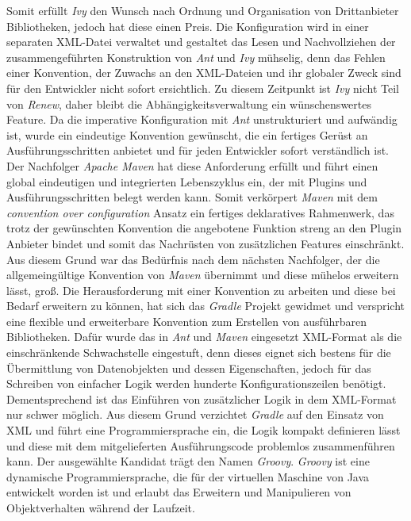 		Somit erfüllt \textit{Ivy} den Wunsch nach Ordnung und Organisation von Drittanbieter Bibliotheken, jedoch hat diese einen Preis. Die Konfiguration wird in einer separaten XML-Datei verwaltet und gestaltet das Lesen und Nachvollziehen der zusammengeführten Konstruktion von \textit{Ant} und \textit{Ivy} mühselig, denn das Fehlen einer Konvention, der Zuwachs an den XML-Dateien und ihr globaler Zweck sind für den Entwickler nicht sofort ersichtlich.\newline
		Zu diesem Zeitpunkt ist \textit{Ivy} nicht Teil von \textit{Renew}, daher bleibt die Abhängigkeitsverwaltung ein wünschenswertes Feature.\bigbreak
		Da die imperative Konfiguration mit \textit{Ant} unstrukturiert und aufwändig ist, wurde ein eindeutige Konvention gewünscht, die ein fertiges Gerüst an Ausführungsschritten anbietet und für jeden Entwickler sofort verständlich ist. Der Nachfolger \textit{Apache Maven} hat diese Anforderung erfüllt und führt einen global eindeutigen und integrierten Lebenszyklus ein, der mit Plugins und Ausführungsschritten belegt werden kann. Somit verkörpert \textit{Maven} mit dem \textit{convention over configuration} Ansatz ein fertiges deklaratives Rahmenwerk, das trotz der gewünschten Konvention die angebotene Funktion streng an den Plugin Anbieter bindet und somit das Nachrüsten von zusätzlichen Features einschränkt. Aus diesem Grund war das Bedürfnis nach dem nächsten Nachfolger, der die allgemeingültige Konvention von \textit{Maven} übernimmt und diese mühelos erweitern lässt, groß.\bigbreak
		Die Herausforderung mit einer Konvention zu arbeiten und diese bei Bedarf erweitern zu können, hat sich das \textit{Gradle} Projekt gewidmet und verspricht eine flexible und erweiterbare Konvention zum Erstellen von ausführbaren Bibliotheken.\newline
		Dafür wurde das in \textit{Ant} und \textit{Maven} eingesetzt XML-Format als die einschränkende Schwachstelle eingestuft, denn dieses eignet sich bestens für die Übermittlung von Datenobjekten und dessen Eigenschaften, jedoch für das Schreiben von einfacher Logik werden hunderte Konfigurationszeilen benötigt. Dementsprechend ist das Einführen von zusätzlicher Logik in dem XML-Format nur schwer möglich. Aus diesem Grund verzichtet \textit{Gradle} auf den Einsatz von XML und führt eine Programmiersprache ein, die Logik kompakt definieren lässt und diese mit dem mitgelieferten Ausführungscode problemlos zusammenführen kann. \newline
		Der ausgewählte Kandidat trägt den Namen \textit{Groovy}. \textit{Groovy} ist eine dynamische Programmiersprache, die für der virtuellen Maschine von Java entwickelt worden ist und erlaubt das Erweitern und Manipulieren von Objektverhalten während der Laufzeit.\newline
